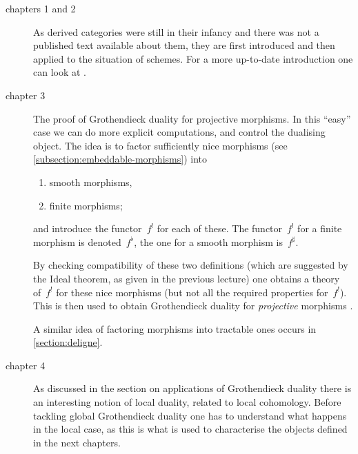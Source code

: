 \begin{description}
  \item[chapters 1 and 2] As derived categories were still in their infancy and there was not a published text available about them, they are first introduced and then applied to the situation of schemes. For a more up-to-date introduction one can look at \cite[chapters 1--3]{huybrechts-fourier-mukai-transforms}.
  \item[chapter 3] The proof of Grothendieck duality for projective morphisms. In this ``easy'' case we can do more explicit computations, and control the dualising object. The idea is to factor sufficiently nice morphisms (see \cref{subsection:embeddable-morphisms}) into
    \begin{enumerate}
      \item smooth morphisms,
      \item finite morphisms;
    \end{enumerate}
    and introduce the functor~$f^!$ for each of these. The functor~$f^!$ for a finite morphism is denoted~$f^\flat$, the one for a smooth morphism is~$f^\sharp$.
    
    By checking compatibility of these two definitions (which are suggested by the Ideal theorem, as given in the previous lecture) one obtains a theory of~$f^!$ for these nice morphisms \cite[theorem III.8.7]{hartshorne-residues-and-duality} (but not all the required properties for~$f^!$). This is then used to obtain Grothendieck duality for \emph{projective} morphisms \cite[\S III.9, III.10]{hartshorne-residues-and-duality}.


    A similar idea of factoring morphisms into tractable ones occurs in \cref{section:deligne}.

  \item[chapter 4] As discussed in the section on applications of Grothendieck duality there is an interesting notion of local duality, related to local cohomology. Before tackling global Grothendieck duality one has to understand what happens in the local case, as this is what is used to characterise the objects defined in the next chapters.


\end{description}
